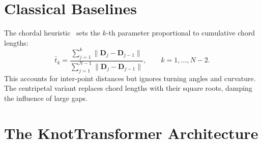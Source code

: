 \documentclass[11pt, a4paper]{article}
\newcommand{\bD}{\mathbf{D}}
\newcommand{\norm}[1]{\lVert #1 \rVert}
\begin{document}
\section{Classical Baselines}
\label{sec:baselines}

The chordal heuristic~\cite{Lee1989} sets the $k$-th parameter
proportional to cumulative chord lengths:
\begin{equation}
  \bar{t}_k = \frac{\sum_{j=1}^{k} \norm{\bD_j - \bD_{j-1}}}
                    {\sum_{j=1}^{N-1} \norm{\bD_j - \bD_{j-1}}},
  \qquad k = 1, \dots, N-2.
  \label{eq:chordal}
\end{equation}
This accounts for inter-point distances but ignores turning angles and
curvature. The centripetal variant replaces chord lengths with their
square roots, damping the influence of large gaps.


\section{The KnotTransformer Architecture}
\label{sec:arch}
\end{document}
